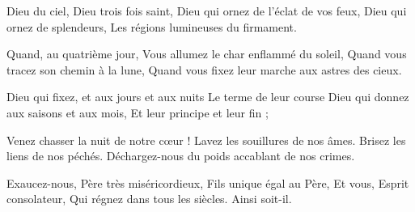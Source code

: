 Dieu du ciel, Dieu trois fois saint,
Dieu qui ornez de l'éclat de vos feux,
Dieu qui ornez de splendeurs,
Les régions lumineuses du firmament.

Quand, au quatrième jour,
Vous allumez le char enflammé du soleil,
Quand vous tracez son chemin à la lune,
Quand vous fixez leur marche aux astres des cieux.

Dieu qui fixez, et aux jours et aux nuits
Le terme de leur course
Dieu qui donnez aux saisons et aux mois,
Et leur principe et leur fin ;

Venez chasser la nuit de notre cœur !
Lavez les souillures de nos âmes.
Brisez les liens de nos péchés.
Déchargez-nous du poids accablant de nos crimes.

Exaucez-nous, Père très miséricordieux,
Fils unique égal au Père,
Et vous, Esprit consolateur,
Qui régnez dans tous les siècles.
Ainsi soit-il.